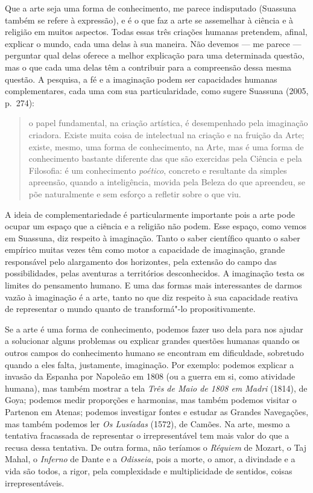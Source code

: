 Que a arte seja uma forma de conhecimento, me parece indisputado
(Suassuna também se refere à expressão), e é o que faz a arte se
assemelhar à ciência e à religião em muitos aspectos. Todas essas três
criações humanas pretendem, afinal, explicar o mundo, cada uma delas à
sua maneira. Não devemos --- me parece --- perguntar qual delas oferece a
melhor explicação para uma determinada questão, mas o que cada uma delas
têm a contribuir para a compreensão dessa mesma questão. A pesquisa, a
fé e a imaginação podem ser capacidades humanas complementares, cada uma
com sua particularidade, como sugere Suassuna (2005, p.~274):

\begin{quote}
o papel fundamental, na criação artística, é desempenhado pela
imaginação criadora. Existe muita coisa de intelectual na criação e na
fruição da Arte; existe, mesmo, uma forma de conhecimento, na Arte, mas
é uma forma de conhecimento bastante diferente das que são exercidas
pela Ciência e pela Filosofia: é um conhecimento \emph{poético},
concreto e resultante da simples apreensão, quando a inteligência,
movida pela Beleza do que apreendeu, se põe naturalmente e sem esforço a
refletir sobre o que viu.
\end{quote}

A ideia de complementariedade é particularmente importante pois a arte
pode ocupar um espaço que a ciência e a religião não podem. Esse espaço,
como vemos em Suassuna, diz respeito à imaginação. Tanto o saber
científico quanto o saber empírico muitas vezes têm como motor a
capacidade de imaginação, grande responsável pelo alargamento
dos horizontes, pela extensão do campo
das possibilidades, pelas aventuras a territórios desconhecidos. A imaginação
testa os limites do pensamento humano. E uma das formas mais
interessantes de darmos vazão à imaginação é a arte, tanto no que diz
respeito à sua capacidade reativa de representar o mundo quanto de
transformá"-lo propositivamente.

Se a arte é uma forma de conhecimento, podemos fazer uso dela para nos
ajudar a solucionar alguns problemas ou explicar grandes questões
humanas quando os outros campos do conhecimento humano se encontram em
dificuldade, sobretudo quando a eles falta, justamente, imaginação. Por
exemplo: podemos explicar a invasão da Espanha por Napoleão em 1808 (ou
a guerra em si, como atividade humana), mas também mostrar a tela
\emph{Três de Maio de 1808 em Madri} (1814), de Goya; podemos medir
proporções e harmonias, mas também podemos visitar o
Partenon em Atenas; podemos investigar fontes e estudar as Grandes
Navegações, mas também podemos ler \emph{Os Lusíadas} (1572), de Camões. Na arte, mesmo a tentativa fracassada de representar o irrepresentável tem mais valor do que a recusa dessa tentativa. De outra forma, não teríamos o \emph{Réquiem} de Mozart, o Taj Mahal, o \emph{Inferno} de Dante e a \emph{Odisseia}, pois a morte, o amor, a divindade e a vida são todos, a rigor, pela complexidade e multiplicidade de sentidos, coisas irrepresentáveis.

